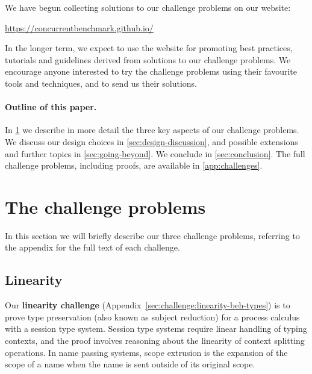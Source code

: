 \documentclass[runningheads]{llncs}
\begin{document}

We have begun collecting solutions to our challenge problems on our website:
%
\begin{center}
  \url{https://concurrentbenchmark.github.io/}
\end{center}
%
In the longer term, we expect to use the website for promoting best practices,
tutorials and guidelines derived from solutions to our challenge problems.
We encourage anyone interested to try the challenge problems using their
favourite tools and techniques, and to send us their solutions.

\paragraph{Outline of this paper.}
In \cref{sec:challenge-problems} we describe in more detail the three key
aspects of our challenge problems.  We discuss our design choices in
\cref{sec:design-discussion}, and possible extensions and further topics in
\cref{sec:going-beyond}.  We conclude in \cref{sec:conclusion}.
The full challenge problems, including proofs, are available in \cref{app:challenges}.

\section{The challenge problems}\label{sec:challenge-problems}
In this section we will briefly describe our three challenge problems, referring to the appendix for the full text of each challenge.

\subsection{Linearity}
Our \textbf{linearity challenge} (Appendix~\ref{sec:challenge:linearity-beh-types}) is to prove type preservation (also known as subject reduction) for a process calculus with a session type system.
Session type systems require linear handling of typing contexts, and the proof involves reasoning about the linearity of context splitting operations.
In name passing systems, scope extrusion is the expansion of the scope of a name when the name is sent outside of its original scope.
\end{document}

